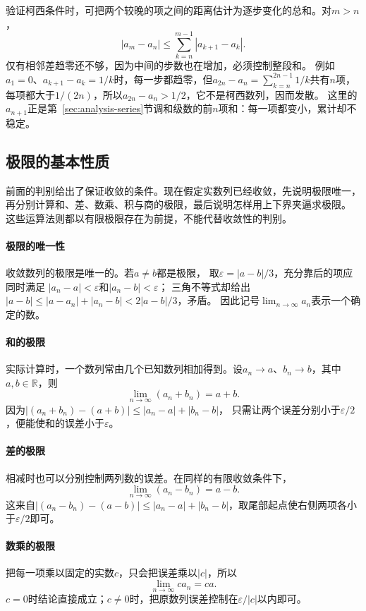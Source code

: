 验证柯西条件时，可把两个较晚的项之间的距离估计为逐步变化的总和。对$m>n$，
\begin{equation}
 |a_m-a_n|\leq\sum_{k=n}^{m-1}|a_{k+1}-a_k|.
\label{eq:analysis-cauchy-tail-bound}
\end{equation}
仅有相邻差趋零还不够，因为中间的步数也在增加，必须控制整段和。
例如$a_1=0$、$a_{k+1}-a_k=1/k$时，每一步都趋零，但$a_{2n}-a_n=\sum_{k=n}^{2n-1}1/k$共有$n$项，
每项都大于$1/(2n)$，所以$a_{2n}-a_n>1/2$，它不是柯西数列，因而发散。
这里的$a_{n+1}$正是第~\ref{sec:analysis-series}节调和级数的前$n$项和：每一项都变小，累计却不稳定。

\subsection{极限的基本性质}

前面的判别给出了保证收敛的条件。现在假定实数列已经收敛，先说明极限唯一，
再分别计算和、差、数乘、积与商的极限，最后说明怎样用上下界夹逼求极限。
这些运算法则都以有限极限存在为前提，不能代替收敛性的判别。

\paragraph{极限的唯一性}
收敛数列的极限是唯一的。若$a\neq b$都是极限，
取$\varepsilon=|a-b|/3$，充分靠后的项应同时满足
$|a_n-a|<\varepsilon$和$|a_n-b|<\varepsilon$；
三角不等式却给出$|a-b|\leq|a-a_n|+|a_n-b|<2|a-b|/3$，矛盾。
因此记号$\lim_{n\to\infty}a_n$表示一个确定的数。

\paragraph{和的极限}
实际计算时，一个数列常由几个已知数列相加得到。设$a_n\to a$、$b_n\to b$，其中$a,b\in\mathbb R$，则
\[
 \lim_{n\to\infty}(a_n+b_n)=a+b.
\]
因为$|(a_n+b_n)-(a+b)|\leq|a_n-a|+|b_n-b|$，
只需让两个误差分别小于$\varepsilon/2$，便能使和的误差小于$\varepsilon$。

\paragraph{差的极限}
相减时也可以分别控制两列数的误差。在同样的有限收敛条件下，
\[
 \lim_{n\to\infty}(a_n-b_n)=a-b.
\]
这来自$|(a_n-b_n)-(a-b)|\leq|a_n-a|+|b_n-b|$，取尾部起点使右侧两项各小于$\varepsilon/2$即可。

\paragraph{数乘的极限}
把每一项乘以固定的实数$c$，只会把误差乘以$|c|$，所以
\[
 \lim_{n\to\infty}ca_n=ca.
\]
$c=0$时结论直接成立；$c\neq0$时，把原数列误差控制在$\varepsilon/|c|$以内即可。

